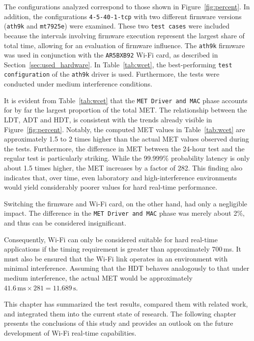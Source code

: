 The configurations analyzed correspond to those shown in Figure~\ref{fig:percent}.  
In addition, the configurations \texttt{4-5-40-1-tcp} with two different firmware versions (\texttt{ath9k} and \texttt{mt7925e}) were examined.  
These two \texttt{test cases} were included because the intervals involving firmware execution represent the largest share of total time, allowing for an evaluation of firmware influence.  
The \texttt{ath9k} firmware was used in conjunction with the \texttt{AR5BXB92} Wi-Fi card, as described in Section~\ref{sec:used_hardware}.  
In Table~\ref{tab:wcet}, the best-performing \texttt{test configuration} of the \texttt{ath9k} driver is used.
Furthermore, the tests were conducted under medium interference conditions.  

It is evident from Table~\ref{tab:wcet} that the \texttt{\ac{MET} Driver and MAC} phase accounts for by far the largest proportion of the total \ac{MET}.  
The relationship between the \ac{LDT}, \ac{ADT} and \ac{HDT}, is consistent with the trends already visible in Figure~\ref{fig:percent}.  
Notably, the computed \ac{MET} values in Table~\ref{tab:wcet} are approximately 1.5 to 2 times higher than the actual \ac{MET} values observed during the tests.  
Furthermore, the difference in \ac{MET} between the 24-hour test and the regular test is particularly striking.  
While the 99.999\% probability latency is only about 1.5 times higher, the \ac{MET} increases by a factor of 282.  
This finding also indicates that, over time, even laboratory and high-interference environments would yield considerably poorer values for hard real-time performance.  

Switching the firmware and Wi-Fi card, on the other hand, had only a negligible impact.  
The difference in the \texttt{\ac{MET} Driver and MAC} phase was merely about 2\%, and thus can be considered insignificant.  

Consequently, Wi-Fi can only be considered suitable for hard real-time applications if the timing requirement is greater than approximately 700\,ms.  
It must also be ensured that the Wi-Fi link operates in an environment with minimal interference.  
Assuming that the \ac{HDT} behaves analogously to that under medium interference, the actual \ac{MET} would be approximately $41.6\,\text{ms} \times 281 = 11.689\,\text{s}$.  

This chapter has summarized the test results, compared them with related work, and integrated them into the current state of research.  
The following chapter presents the conclusions of this study and provides an outlook on the future development of Wi-Fi real-time capabilities.  
